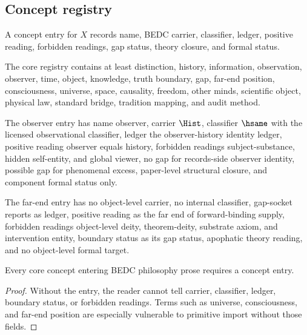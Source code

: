 \subsection{Concept registry}
\label{subsec:philosophy-concept-registry}

\begin{definition}
\label{def:philosophy-concept-entry}
A concept entry for \(X\) records name, BEDC carrier, classifier,
ledger, positive reading, forbidden readings, gap status, theory
closure, and formal status.
\end{definition}

\begin{definition}
\label{def:philosophy-core-concept-registry}
The core registry contains at least distinction, history, information,
observation, observer, time, object, knowledge, truth boundary, gap,
far-end position, consciousness, universe, space, causality, freedom,
other minds, scientific object, physical law, standard bridge,
tradition mapping, and audit method.
\end{definition}

\begin{definition}
\label{def:philosophy-observer-concept-entry}
The observer entry has name observer, carrier \(\Hist\), classifier
\(\hsame\) with the licensed observational classifier, ledger the
observer-history identity ledger, positive reading observer equals
history, forbidden readings subject-substance, hidden self-entity, and
global viewer, no gap for records-side observer identity, possible gap
for phenomenal excess, paper-level structural closure, and component
formal status only.
\end{definition}

\begin{definition}
\label{def:philosophy-far-end-concept-entry}
The far-end entry has no object-level carrier, no internal classifier,
gap-socket reports as ledger, positive reading as the far end of
forward-binding supply, forbidden readings object-level deity,
theorem-deity, substrate axiom, and intervention entity, boundary
status as its gap status, apophatic theory reading, and no object-level
formal target.
\end{definition}

\begin{theorem}
\label{thm:philosophy-core-concepts-require-entries}
Every core concept entering BEDC philosophy prose requires a concept
entry.
\end{theorem}
\begin{proof}
Without the entry, the reader cannot tell carrier, classifier, ledger,
boundary status, or forbidden readings. Terms such as universe,
consciousness, and far-end position are especially vulnerable to
primitive import without those fields.
\end{proof}

